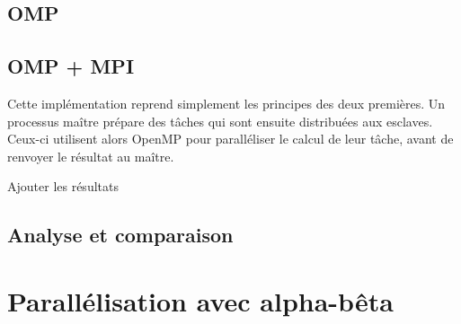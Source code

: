 \documentclass[12pt]{article}
\begin{document}
    \subsection{OMP}
    \subsection{OMP + MPI}
    Cette implémentation reprend simplement 
    les principes des deux premières. Un processus maître prépare des tâches
    qui sont ensuite distribuées aux esclaves. Ceux-ci utilisent alors OpenMP
    pour paralléliser le calcul de leur tâche, avant de renvoyer le résultat
    au maître.\\
    \par {\color{red} Ajouter les résultats}
    \subsection{Analyse et comparaison}

\section{Parallélisation avec alpha-bêta}
\end{document}
